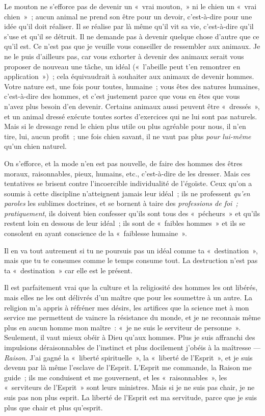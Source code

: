 \documentclass[french,twoside]{book} %
\begin{document}
Le mouton ne s’efforce pas de devenir un « vrai mouton, » ni le chien un « vrai chien » ; aucun animal ne prend son être pour un devoir, c’est-à-dire pour une idée qu’il doit réaliser. Il se réalise par là même qu’il vit sa vie, c’est-à-dire qu’il s’use et qu’il se détruit. Il ne demande pas à devenir quelque chose d’autre que ce qu’il est. Ce n’est pas que je veuille vous conseiller de ressembler aux animaux. Je ne le puis d’ailleurs pas, car vous exhorter à devenir des animaux serait vous proposer de nouveau une tâche, un idéal (« l’abeille peut t’en remontrer en application ») ; cela équivaudrait à souhaiter aux animaux de devenir hommes. Votre nature est, une fois pour toutes, humaine ; vous êtes des natures humaines, c’est-à-dire des hommes, et c’est justement parce que vous en êtes que vous n’avez plus besoin d’en devenir. Certains animaux aussi peuvent être « dressés », et un animal dressé exécute toutes sortes d’exercices qui ne lui sont pas naturels. Mais si le dressage rend le chien plus utile ou plus agréable pour nous, il n’en tire, lui, aucun profit ; une fois chien savant, il ne vaut pas plus \emph{pour lui-même} qu’un chien naturel.\par
On s’efforce, et la mode n’en est pas nouvelle, de faire des hommes des êtres moraux, raisonnables,  pieux, humains, etc., c’est-à-dire de les dresser. Mais ces tentatives se brisent contre l’incoercible individualité de l’égoïste. Ceux qu’on a soumis à cette discipline n’atteignent jamais leur idéal ; ils ne professent \emph{qu’en paroles} les sublimes doctrines, et se bornent à taire des \emph{professions de foi ; pratiquement}, ils doivent bien confesser qu’ils sont tous des « pécheurs » et qu’ils restent loin en dessous de leur idéal ; ils sont de « faibles hommes » et ils se consolent en ayant conscience de la « faiblesse humaine ».\par
Il en va tout autrement si tu ne poursuis pas un idéal comme ta « destination », mais que tu te consumes comme le temps consume tout. La destruction n’est pas ta « destination » car elle est le présent.\par
Il est parfaitement vrai que la culture et la religiosité des hommes les ont libérés, mais elles ne les ont délivrés d’un maître que pour les soumettre à un autre. La religion m’a appris à réfréner mes désirs, les artifices que la science met à mon service me permettent de vaincre la résistance du monde, et je ne reconnais même plus en aucun homme mon maître : « je ne suis le serviteur de personne ». Seulement, il vaut mieux obéir à Dieu qu’aux hommes. Plus je suis affranchi des impulsions déraisonnables de l’instinct et plus docilement j’obéis à la maîtresse — \emph{Raison}. J’ai gagné la « liberté spirituelle », la « liberté de l’Esprit », et je suis devenu par là même l’esclave de l’Esprit. L’Esprit me commande, la Raison me guide ; ils me conduisent et me gouvernent, et les « raisonnables », les « serviteurs de l’Esprit » sont leurs ministres. Mais si je ne suis pas chair, je ne suis pas non plus esprit. La liberté de l’Esprit est ma servitude, parce que je suis plus que chair et plus qu’esprit.\par
\end{document}
